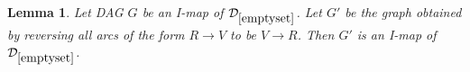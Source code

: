 \documentclass{elsarticle}%
\newtheorem{lemma}[theorem]{Lemma}
\newcommand{\D}{\mathcal{D}}
\begin{document}

%

\begin{lemma} \label{ass:reverse-root}
Let DAG $G$ be an I-map of $\D_{\ref{emptyset}}$. Let
$G'$ be the graph obtained by reversing all arcs of the form
$R\rightarrow V$ to be $V\rightarrow R$. 
Then $G'$ is an I-map of $\D_{\ref{emptyset}}$.
\end{lemma}
\end{document}
